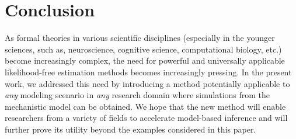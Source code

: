 \documentclass[9pt,twoside,lineno]{pnas-new}
\begin{document}
\section*{Conclusion}

As formal theories in various scientific disciplines (especially in the younger sciences, such as, neuroscience, cognitive science, computational biology, etc.) become increasingly complex, the need for powerful and universally applicable likelihood-free estimation methods becomes increasingly pressing. In the present work, we addressed this need by introducing a method potentially applicable to \textit{any} modeling scenario in \textit{any} research domain where simulations from the mechanistic model can be obtained. We hope that the new method will enable researchers from a variety of fields to accelerate model-based inference and will further prove its utility beyond the examples considered in this paper.



\showacknow %


\end{document}

